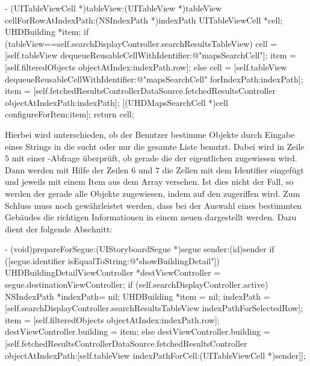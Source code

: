 \documentclass{report}
\begin{document}
\begin{objclst}
- (UITableViewCell *)tableView:(UITableView *)tableView cellForRowAtIndexPath:(NSIndexPath *)indexPath
{
	UITableViewCell *cell;
    UHDBuilding *item;
    if (tableView==self.searchDisplayController.searchResultsTableView) {
        cell = [self.tableView dequeueReusableCellWithIdentifier:@"mapsSearchCell"];
        item = [self.filteredObjects objectAtIndex:indexPath.row];
    } else {
		cell = [self.tableView dequeueReusableCellWithIdentifier:@"mapsSearchCell" forIndexPath:indexPath];
		item = [self.fetchedResultsControllerDataSource.fetchedResultsController objectAtIndexPath:indexPath];
    }
    [(UHDMapsSearchCell *)cell configureForItem:item];
	return cell;
}
\end{objclst}

Hierbei wird unterschieden, ob der Benutzer bestimme Objekte durch Eingabe eines Strings in die  sucht oder nur die gesamte Liste benutzt. Dabei wird in Zeile $5$ mit einer -Abfrage überprüft, ob gerade die  der eigentlichen  zugewiesen wird. Dann werden mit Hilfe der Zeilen $6$ und $7$ die Zellen mit dem Identifier  eingefügt und jeweils mit einem Item aus dem Array  versehen. Ist dies nicht der Fall, so werden der  gerade alle Objekte zugewiesen, indem auf den  zugeriffen wird. Zum Schluss muss noch gewährleistet werden, dass bei der Auswahl eines bestimmten Gebäudes die richtigen Informationen in einem neuen  dargestellt werden. Dazu dient der folgende Abschnitt:

\begin{objclst}
- (void)prepareForSegue:(UIStoryboardSegue *)segue sender:(id)sender
{
    if ([segue.identifier isEqualToString:@"showBuildingDetail"])
    {
        UHDBuildingDetailViewController *destViewController = segue.destinationViewController;
        if (self.searchDisplayController.active)
        {
            NSIndexPath *indexPath= nil;
            UHDBuilding *item = nil;
            indexPath = [self.searchDisplayController.searchResultsTableView indexPathForSelectedRow];
            item = [self.filteredObjects objectAtIndex:indexPath.row];
            destViewController.building = item;
        } else
        {
            destViewController.building = [self.fetchedResultsControllerDataSource.fetchedResultsController objectAtIndexPath:[self.tableView indexPathForCell:(UITableViewCell *)sender]];
        }
    }
}
\end{objclst}
\end{document}
